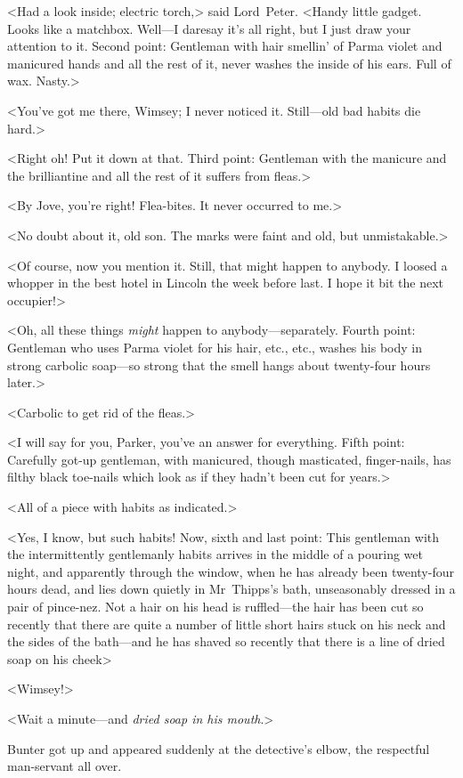 <Had a look inside; electric torch,> said Lord~Peter. <Handy little gadget. Looks like a matchbox. Well—I daresay it's all right, but I just draw your attention to it. Second point: Gentleman with hair smellin' of Parma violet and manicured hands and all the rest of it, never washes the inside of his ears. Full of wax. Nasty.>

<You've got me there, Wimsey; I never noticed it. Still—old bad habits die hard.>

<Right oh! Put it down at that. Third point: Gentleman with the manicure and the brilliantine and all the rest of it suffers from fleas.>

<By Jove, you're right! Flea-bites. It never occurred to me.>

<No doubt about it, old son. The marks were faint and old, but unmistakable.>

<Of course, now you mention it. Still, that might happen to anybody. I loosed a whopper in the best hotel in Lincoln the week before last. I hope it bit the next occupier!>

<Oh, all these things \emph{might} happen to anybody—separately. Fourth point: Gentleman who uses Parma violet for his hair, etc., etc., washes his body in strong carbolic soap—so strong that the smell hangs about twenty-four hours later.>

<Carbolic to get rid of the fleas.>

<I will say for you, Parker, you've an answer for everything. Fifth point: Carefully got-up gentleman, with manicured, though masticated, finger-nails, has filthy black toe-nails which look as if they hadn't been cut for years.>

<All of a piece with habits as indicated.>

<Yes, I know, but such habits! Now, sixth and last point: This gentleman with the intermittently gentlemanly habits arrives in the middle of a pouring wet night, and apparently through the window, when he has already been twenty-four hours dead, and lies down quietly in Mr~Thipps's bath, unseasonably dressed in a pair of pince-nez. Not a hair on his head is ruffled—the hair has been cut so recently that there are quite a number of little short hairs stuck on his neck and the sides of the bath—and he has shaved so recently that there is a line of dried soap on his cheek\longdash>

<Wimsey!>

<Wait a minute—and \emph{dried soap in his mouth}.>

Bunter got up and appeared suddenly at the detective's elbow, the respectful man-servant all over.

